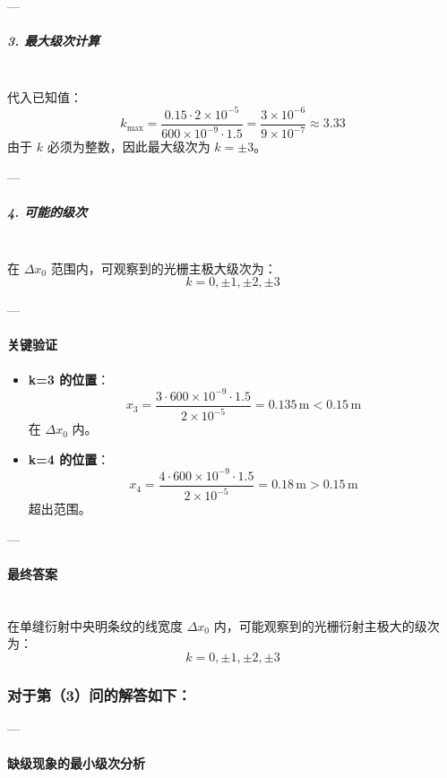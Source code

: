 \documentclass{article}
\begin{document}
{---

\subparagraph*{3. 最大级次计算} \mbox{} \\

代入已知值：  
\[
k_{\text{max}} = \frac{0.15 \cdot 2 \times 10^{-5}}{600 \times 10^{-9} \cdot 1.5} = \frac{3 \times 10^{-6}}{9 \times 10^{-7}} \approx 3.33
\]  
由于 \( k \) 必须为整数，因此最大级次为 \( k = \pm 3 \)。

---

\subparagraph*{4. 可能的级次} \mbox{} \\

在 \(\Delta x_0\) 范围内，可观察到的光栅主极大级次为：  
\[
k = 0, \pm 1, \pm 2, \pm 3
\]

---

\paragraph*{关键验证}

\begin{itemize}
    \item \textbf{k=3 的位置}：  
    \[
    x_3 = \frac{3 \cdot 600 \times 10^{-9} \cdot 1.5}{2 \times 10^{-5}} = 0.135 \, \text{m} < 0.15 \, \text{m}
    \]  
    在 \(\Delta x_0\) 内。  
    \item \textbf{k=4 的位置}：  
    \[
    x_4 = \frac{4 \cdot 600 \times 10^{-9} \cdot 1.5}{2 \times 10^{-5}} = 0.18 \, \text{m} > 0.15 \, \text{m}
    \]  
    超出范围。
\end{itemize}

---

\paragraph*{最终答案} \mbox{} \\

在单缝衍射中央明条纹的线宽度 \(\Delta x_0\) 内，可能观察到的光栅衍射主极大的级次为：  
\[
\boxed{k = 0, \pm 1, \pm 2, \pm 3}
\]

\subsubsection*{对于第（3）问的解答如下：}

---

\paragraph*{缺级现象的最小级次分析}

}
\end{document}

